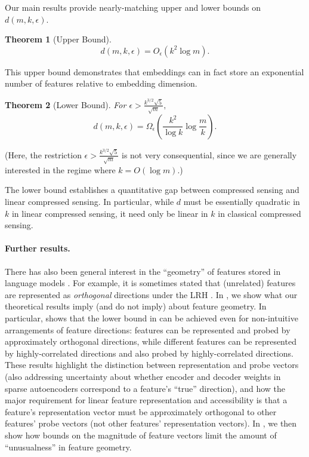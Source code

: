 \documentclass[11pt]{article}
\newtheorem{theorem}{Theorem}
\begin{document}
Our main results provide nearly-matching upper and lower bounds on $d(m,k,\epsilon).$

\begin{theorem}[Upper Bound]\label{thm:upper}
    \begin{equation}
        d(m,k,\epsilon) = O_\epsilon\left(k^2\log m\right).
    \end{equation}
\end{theorem}
This upper bound demonstrates that embeddings can in fact store an exponential number of features relative to embedding dimension.

\begin{theorem}[Lower Bound]\label{thm:lower}
For $\epsilon > \frac{k^{3/2}\sqrt{5}}{\sqrt{m}},$
    \begin{equation}
        d(m,k,\epsilon) = \Omega_\epsilon\left(\frac{k^2}{\log k}\log \frac{m}{k}\right).
    \end{equation}
\end{theorem}

(Here, the restriction $\epsilon > \frac{k^{3/2}\sqrt{5}}{\sqrt{m}}$ is not very consequential, since we are generally interested in the regime where $k = O(\log m).$)

The lower bound establishes a quantitative gap between compressed sensing and linear compressed sensing. In particular, while $d$ must be essentially quadratic in $k$ in linear compressed sensing, it need only be linear in $k$ in classical compressed sensing.

\paragraph{Further results.} There has also been general interest in the ``geometry'' of features stored in language models \citep{park2023linear}. For example, it is sometimes stated that (unrelated) features are represented as \textit{orthogonal} directions under the LRH \citep{hindupur2025projecting}. In , we show what our theoretical results imply (and do not imply) about feature geometry. In particular,  shows that the lower bound in  can be achieved even for non-intuitive arrangements of feature directions: features can be represented and probed by approximately orthogonal directions, while different features can be represented by highly-correlated directions and also probed by highly-correlated directions. These results  highlight the distinction between representation and probe vectors (also addressing uncertainty about whether encoder and decoder weights in sparse autoencoders correspond to a feature's ``true'' direction), and how the major requirement for linear feature representation and accessibility is that a feature's representation vector must be approximately orthogonal to other features' probe vectors (not other features' representation vectors). In , we then show how bounds on the magnitude of feature vectors limit the amount of ``unusualness'' in feature geometry.
\end{document}
